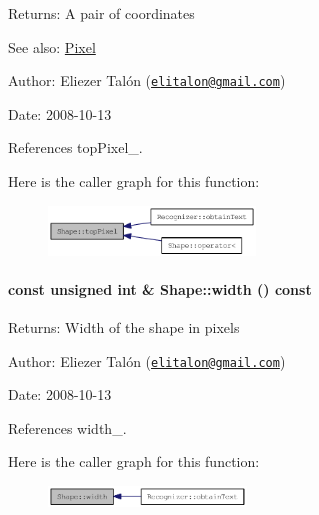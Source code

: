 \begin{Desc}
\item[Returns:]A pair of coordinates\end{Desc}
\begin{Desc}
\item[See also:]\hyperlink{_shape_8hpp_535e59456e3e633842529cfa8ea103c4}{Pixel}\end{Desc}
\begin{Desc}
\item[Author:]Eliezer Talón (\href{mailto:elitalon@gmail.com}{\tt elitalon@gmail.com}) \end{Desc}
\begin{Desc}
\item[Date:]2008-10-13 \end{Desc}


References topPixel\_\-.

Here is the caller graph for this function:\nopagebreak
\begin{figure}[H]
\begin{center}
\leavevmode
\includegraphics[width=156pt]{class_shape_063c4934d8c1cd4b02e4e3e4a604f62e_icgraph}
\end{center}
\end{figure}
\hypertarget{class_shape_6773dfedb96ef750e5469e22d51ecf0f}{
\paragraph[{width}]{\setlength{\rightskip}{0pt plus 5cm}const unsigned int \& Shape::width () const}\hfill}
\label{class_shape_6773dfedb96ef750e5469e22d51ecf0f}


\begin{Desc}
\item[Returns:]Width of the shape in pixels\end{Desc}
\begin{Desc}
\item[Author:]Eliezer Talón (\href{mailto:elitalon@gmail.com}{\tt elitalon@gmail.com}) \end{Desc}
\begin{Desc}
\item[Date:]2008-10-13 \end{Desc}


References width\_\-.

Here is the caller graph for this function:\nopagebreak
\begin{figure}[H]
\begin{center}
\leavevmode
\includegraphics[width=149pt]{class_shape_6773dfedb96ef750e5469e22d51ecf0f_icgraph}
\end{center}
\end{figure}

